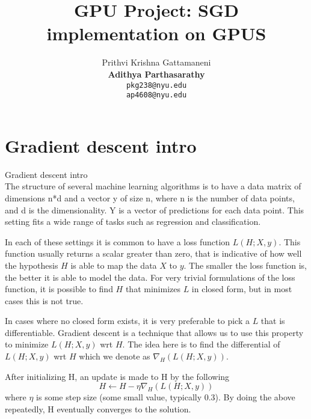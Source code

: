 \documentclass{article}
\title{GPU Project: SGD implementation on GPUS}
\author{
  Prithvi Krishna Gattamaneni\\
  \textbf{Adithya Parthasarathy}\\
  \texttt{pkg238@nyu.edu} \\
  \texttt{ap4608@nyu.edu}
}
\begin{document}
\maketitle

\section{Gradient descent intro} %
Gradient descent intro\\
The structure of several machine learning algorithms is to have a data matrix of dimensions n*d and a vector y of size n, where n is the number of data points, and d is the dimensionality. Y is a vector of predictions for each data point. This setting fits a wide range of tasks such as regression and classification. 


In each of these settings it is common to have a loss function $L(H;X,y)$. This function usually returns a scalar greater than zero, that is indicative of how well the hypothesis $H$ is able to map the data $X$ to $y$. The smaller the loss function is, the better it is able to model the data. For very trivial formulations of the loss function, it is possible to find $H$ that minimizes $L$ in closed form, but in most cases this is not true. 


In cases where no closed form exists, it is very preferable to pick a $L$ that is differentiable. Gradient descent is a technique that allows us to use this property to minimize $L(H;X,y)$ wrt $H$. The idea here is to find the differential of $L(H;X,y)$ wrt $H$ which we denote as $\nabla_{H}(L(H;X,y))$.

After initializing H, an update is made to H by the following
$$H \leftarrow H - \eta \nabla_{H}(L(H;X,y))$$
where $\eta$ is some step size (some small value, typically 0.3). By doing the above repeatedly, H eventually converges to the solution.
\end{document}

